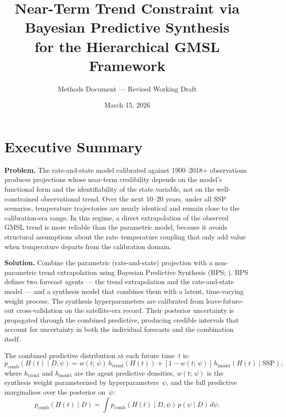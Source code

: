\documentclass[11pt]{article}
\title{Near-Term Trend Constraint via Bayesian Predictive Synthesis\\
  for the Hierarchical GMSL Framework}
\author{Methods Document --- Revised Working Draft}
\date{March 15, 2026}
\begin{document}
\maketitle

\section{Executive Summary}

\textbf{Problem.}  The rate-and-state model calibrated against 1900--2018+ observations produces projections whose near-term credibility depends on the model's functional form and the identifiability of the state variable, not on the well-constrained observational trend.  Over the next 10--20 years, under all SSP scenarios, temperature trajectories are nearly identical and remain close to the calibration-era range.  In this regime, a direct extrapolation of the observed GMSL trend is more reliable than the parametric model, because it avoids structural assumptions about the rate--temperature coupling that only add value when temperature departs from the calibration domain.

\textbf{Solution.}  Combine the parametric (rate-and-state) projection with a non-parametric trend extrapolation using Bayesian Predictive Synthesis (BPS; \citealt{McAlinn2019}).  BPS defines two forecast agents --- the trend extrapolation and the rate-and-state model --- and a synthesis model that combines them with a latent, time-varying weight process.  The synthesis hyperparameters are calibrated from leave-future-out cross-validation on the satellite-era record.  Their posterior uncertainty is propagated through the combined predictive, producing credible intervals that account for uncertainty in both the individual forecasts and the combination itself.

The combined predictive distribution at each future time~$t$ is:
\begin{equation}
  p_{\mathrm{comb}}(H(t) \mid D, \psi) = w(t;\,\psi)\,h_{\mathrm{trend}}(H(t)) + [1 - w(t;\,\psi)]\,h_{\mathrm{model}}(H(t) \mid \mathrm{SSP}),
  \label{eq:bps_predictive}
\end{equation}
where $h_{\mathrm{trend}}$ and $h_{\mathrm{model}}$ are the agent predictive densities, $w(t;\,\psi)$ is the synthesis weight parameterized by hyperparameters~$\psi$, and the full predictive marginalises over the posterior on~$\psi$:
\begin{equation}
  p_{\mathrm{comb}}(H(t) \mid D) = \int p_{\mathrm{comb}}(H(t) \mid D, \psi)\,p(\psi \mid D)\,d\psi.
  \label{eq:bps_marginal}
\end{equation}
\end{document}
